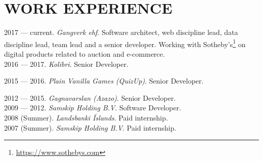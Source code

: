 \section{WORK EXPERIENCE}

2017 --- current. \emph{Gangverk ehf}.
Software architect, web discipline lead, data discipline lead, team lead and a senior developer. Working with Sotheby's\footnote{\url{https://www.sothebys.com}} on digital products related to auction and e-commerce.\\


2016 --- 2017. \emph{Kolibri}. Senior Developer.

2015 --- 2016. \emph{Plain Vanilla Games (QuizUp)}. Senior Developer.

2012 --- 2015. \emph{Gagnavarslan (Azazo)}. Senior Developer.\\

2009 --- 2012. \emph{Samskip Holding B.V}. Software Developer.\\

2008 (Summer). \emph{Landsbanki Íslands}. Paid internship.\\

2007 (Summer). \emph{Samskip Holding B.V}. Paid internship.


